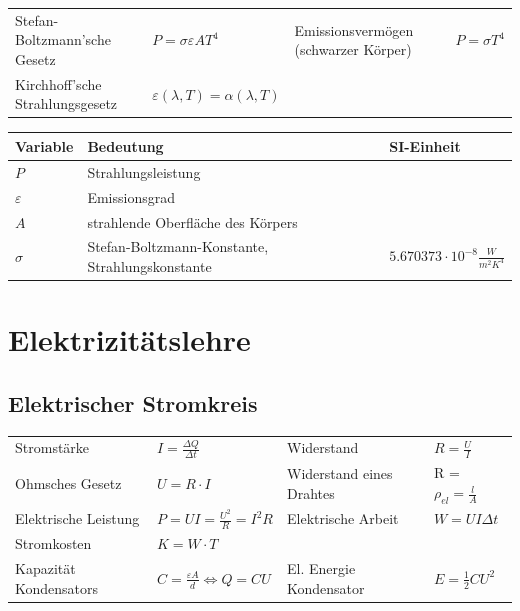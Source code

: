 \documentclass[
a4paper,
oneside,
landscape, 
8pt,
]{scrartcl}
\begin{document}
\begin{multicols*}{2}
\begin{tabbing}
	\begin{tabu} to \linewidth {X l X l}
		\toprule
		Stefan-Boltzmann'sche Gesetz & $P = \sigma \varepsilon AT^4$ &
		Emissionsvermögen (schwarzer Körper) & $P = \sigma T^4$ \\
		Kirchhoff'sche Strahlungsgesetz & $\varepsilon(\lambda, T) = \alpha(\lambda, T)$ & & \\
	\end{tabu}
\end{tabbing}

\begin{tabbing}
	\begin{tabu} to \linewidth {l X l}
		Variable & Bedeutung & SI-Einheit \\
		\midrule
		$P$ & Strahlungsleistung & \\
		$\varepsilon$ & Emissionsgrad & \\
		$A$ & strahlende Oberfläche des Körpers & \\
		$\sigma$ & Stefan-Boltzmann-Konstante, Strahlungskonstante & $5.670373 \cdot 10^{-8} \frac{W}{m^2 K^4}$ \\
		\bottomrule
	\end{tabu}
\end{tabbing}

\clearpage

\section{Elektrizitätslehre}
\subsection{Elektrischer Stromkreis}
\begin{tabbing}
	\begin{tabu} to \linewidth {l X l X}
		\toprule
		Stromstärke & $I = \frac{\Delta Q}{\Delta t}$ & 
		Widerstand & $R = \frac{U}{I}$ \\
		Ohmsches Gesetz & $U = R \cdot I$ & 
		Widerstand eines Drahtes & R = $\rho_{el} = \frac{l}{A}$ \\
		Elektrische Leistung & $P = UI = \frac{U^2}{R} = I^2 R$ & 
		Elektrische Arbeit & $W = UI\Delta t$ \\
		Stromkosten & $K = W \cdot T$ & \\
		Kapazität Kondensators & $C= \frac{\varepsilon A}{d} \Leftrightarrow Q = CU$ &
		El. Energie Kondensator & $E=\frac{1}{2} CU^2$\\
	\end{tabu}
\end{tabbing}



\end{multicols*}
\end{document}
